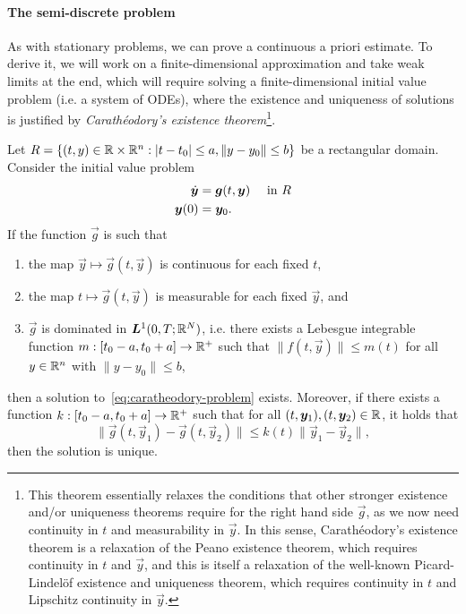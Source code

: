\paragraph{The semi-discrete problem}
As with stationary problems, we can prove a continuous a priori estimate. To derive it, we will work on a finite-dimensional approximation and take weak limits at the end, which will require solving a finite-dimensional initial value problem (i.e. a system of ODEs), where the existence and uniqueness of solutions is justified by \emph{Carathéodory's existence theorem}\footnote{This theorem essentially relaxes the conditions that other stronger existence and/or uniqueness theorems require for the right hand side $\vec g$, as we now need continuity in $t$ and measurability in $\vec y$. In this sense, Carathéodory's existence theorem is a relaxation of the Peano existence theorem, which requires continuity in $t$ and $\vec y$, and this is itself a relaxation of the well-known Picard-Lindelöf existence and uniqueness theorem, which requires continuity in $t$ and Lipschitz continuity in $\vec y$.}. 
\begin{theorem}\label{thm:caratheodory-existence}
    Let $R = \{(t,y)\in \mathbb{R}\times \mathbb{R}^n: |t-t_0|\leq a, \|y-y_0\|\leq b\}$ be a rectangular domain. Consider the initial value problem
    \begin{equation}\label{eq:caratheodory-problem}
        \begin{aligned}
            \dot{\vec y} &= \vec g(t, \vec y) &&\tin R\\
            \vec y(0) &= \vec y_0.
        \end{aligned}
    \end{equation}
    If the function $\vec g$ is such that 
    \begin{enumerate}
        \item the map $\vec y \mapsto \vec g(t, \vec y)$ is continuous for each fixed $t$, 
        \item the map $t\mapsto \vec g(t, \vec y)$ is measurable for each fixed $\vec y$, and 
        \item $\vec g$ is dominated in $\vec L^1(0,T;\R^N)$, i.e. there exists a Lebesgue integrable function $m:[t_0-a,t_0+a]\to\mathbb{R}^+$ such that $\|f(t, \vec y)\|\leq m(t)$ for all $y\in\mathbb{R}^n$ with $\|y-y_0\|\leq b$,
    \end{enumerate}
    then a solution to~\ref{eq:caratheodory-problem} exists. Moreover, if there exists a function $k:[t_0-a,t_0+a]\to \mathbb{R}^+$ such that for all $(t,\vec y_1),(t,\vec y_2)\in\R$, it holds that 
    \begin{equation*}
        \|\vec g(t, \vec y_1) - \vec g(t,\vec y_2)\| \leq k(t)\|\vec y_1-\vec y_2\|,
    \end{equation*}
    then the solution is unique.
\end{theorem}
